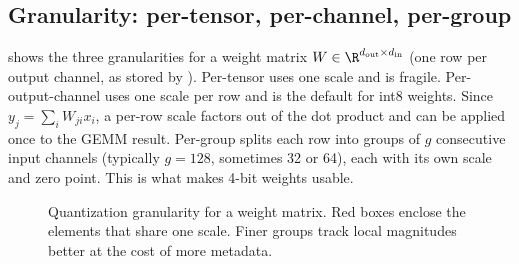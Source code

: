 \subsection{Granularity: per-tensor, per-channel, per-group}
 shows the three granularities for a weight matrix
$W\in\R^{d_{\text{out}}\times d_{\text{in}}}$ (one row per output channel, as stored by
). Per-tensor uses one scale and is fragile. Per-output-channel uses one
scale per row and is the default for int8 weights. Since $y_j=\sum_i W_{ji}x_i$, a
per-row scale factors out of the dot product and can be applied once to the GEMM
result. Per-group splits each row into groups of $g$ consecutive input channels
(typically $g=128$, sometimes 32 or 64), each with its own scale and zero point. This is
what makes 4-bit weights usable.

\begin{figure}[t]
\centering
{}
\caption{Quantization granularity for a weight matrix. Red boxes enclose the elements
that share one scale. Finer groups track local magnitudes better at the cost of more
metadata.}
\label{fig:efficient:granularity}
\end{figure}

